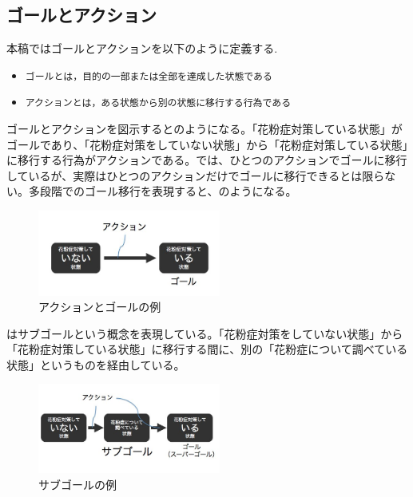 \documentclass[submit,techreq]{ipsj}
\def\|{\verb|}
\begin{document}
%3.1
\subsection{ゴールとアクション}

本稿ではゴールとアクションを以下のように定義する.

\begin{itemize}
\item \|ゴールとは，目的の一部または全部を達成した状態である|
\item \|アクションとは，ある状態から別の状態に移行する行為である|
\end{itemize}

ゴールとアクションを図示するとのようになる。「花粉症対策している状態」がゴールであり、「花粉症対策をしていない状態」から「花粉症対策している状態」に移行する行為がアクションである。では、ひとつのアクションでゴールに移行しているが、実際はひとつのアクションだけでゴールに移行できるとは限らない。多段階でのゴール移行を表現すると、のようになる。

\begin{figure}[tb]
\includegraphics[width=6cm, bb=0 0 400 300]{action_goal.jpg}
\caption{アクションとゴールの例}
\label{fig:action_goal}
\end{figure}

はサブゴールという概念を表現している。「花粉症対策をしていない状態」から「花粉症対策している状態」に移行する間に、別の「花粉症について調べている状態」というものを経由している。


\begin{figure}[tb]
\includegraphics[width=6cm, bb=0 0 450 300]{sub_goal.jpg}
\caption{サブゴールの例}
\label{fig:sub_goal}
\end{figure}
\end{document}
